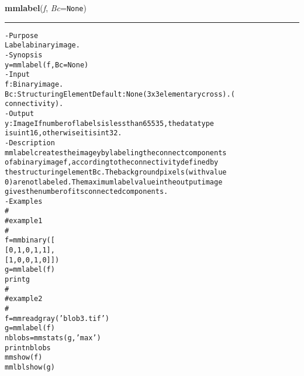     \begin{boxedminipage}{\textwidth}

    \raggedright \textbf{mmlabel}(\textit{f}, \textit{Bc}=\texttt{N\-o\-n\-e\-})

    \vspace{-1.5ex}

    \rule{\textwidth}{0.5\fboxrule}
\begin{alltt}
- Purpose
    Label a binary image.
- Synopsis
    y = mmlabel(f, Bc=None)
- Input
    f:  Binary image.
    Bc: Structuring Element Default: None (3x3 elementary cross). (
        connectivity).
- Output
    y: Image If number of labels is less than 65535, the data type
       is uint16, otherwise it is int32.
- Description
    mmlabel creates the image y by labeling the connect components
    of a binary image f , according to the connectivity defined by
    the structuring element Bc . The background pixels (with value
    0) are not labeled. The maximum label value in the output image
    gives the number of its connected components.
- Examples
    \#
    \#   example 1
    \#
    f=mmbinary([
       [0,1,0,1,1],
       [1,0,0,1,0]])
    g=mmlabel(f)
    print g
    \#
    \#   example 2
    \#
    f = mmreadgray('blob3.tif')
    g=mmlabel(f)
    nblobs=mmstats(g,'max')
    print nblobs
    mmshow(f)
    mmlblshow(g)\end{alltt}

    \vspace{1ex}

    \end{boxedminipage}

    \label{multireg:num_pymorph:mmlabelflat}
    \vspace{0.5ex}

